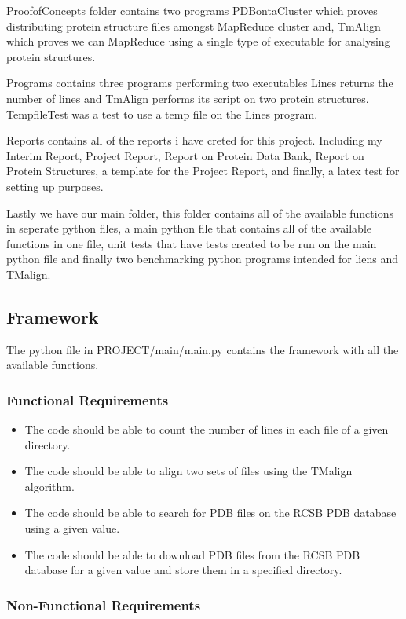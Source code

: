 \documentclass[]{final_report}
\begin{document}
ProofofConcepts folder contains two programs PDBontaCluster which proves distributing protein structure files amongst MapReduce cluster and, TmAlign which proves we can MapReduce using a single type of executable for analysing protein structures.

Programs contains three programs performing two executables Lines returns the number of lines and TmAlign performs its script on two protein structures. TempfileTest was a test to use a temp file on the Lines program.

Reports contains all of the reports i have creted for this project. Including my Interim Report, Project Report, Report on Protein Data Bank, Report on Protein Structures, a template for the Project Report, and finally, a latex test for setting up purposes.

Lastly we have our main folder, this folder contains all of the available functions in seperate python files, a main python file that contains all of the available functions in one file, unit tests that have tests created to be run on the main python file and finally two benchmarking python programs intended for liens and TMalign.

\subsection{Framework}
The python file in PROJECT/main/main.py contains the framework with all the available functions.

\subsubsection{Functional Requirements}

\begin{itemize}
    \item The code should be able to count the number of lines in each file of a given directory.
    \item The code should be able to align two sets of files using the TMalign algorithm.
    \item The code should be able to search for PDB files on the RCSB PDB database using a given value.
    \item The code should be able to download PDB files from the RCSB PDB database for a given value and store them in a specified directory.
\end{itemize}

\subsubsection{Non-Functional Requirements}
\end{document}
